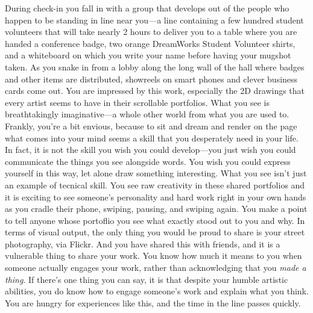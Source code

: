 \documentclass[../main.tex]{subfiles}
\begin{document}
During check-in you fall in with a group that develops out of the people who happen to be standing in line near you---a line containing a few hundred student volunteers that will take nearly 2 hours to deliver you to a table where you are handed a conference badge, two orange DreamWorks Student Volunteer shirts, and a whiteboard on which you write your name before having your mugshot taken. As you snake in from a lobby along the long wall of the hall where badges and other items are distributed, showreels on smart phones and clever business cards come out. You are impressed by this work, especially the 2D drawings that every artist seems to have in their scrollable portfolios. What you see is breathtakingly imaginative---a whole other world from what you are used to. Frankly, you're a bit envious, because to sit and dream and render on the page what comes into your mind seems a skill that you desperately need in your life. In fact, it is not the skill you wish you could develop---you just wish you could communicate the things you see alongside words. You wish you could express yourself in this way, let alone draw something interesting. What you see isn't just an example of tecnical skill. You see raw creativity in these shared portfolios and it is exciting to see someone's personality and hard work right in your own hands as you cradle their phone, swiping, pausing, and swiping again. You make a point to tell anyone whose portoflio you see what exactly stood out to you and why. In terms of visual output, the only thing you would be proud to share is your street photography, via Flickr. And you have shared this with friends, and it is a vulnerable thing to share your work. You know how much it means to you when someone actually engages your work, rather than acknowledging that you \textit{made a thing}. If there's one thing you can say, it is that despite your humble artistic abilities, you do know how to engage someone's work and explain what you think. You are hungry for experiences like this, and the time in the line passes quickly.
\end{document}

